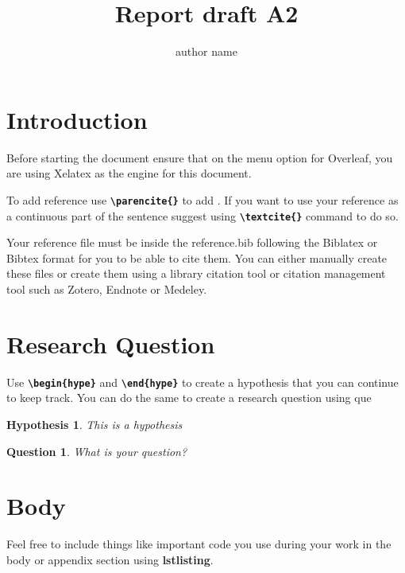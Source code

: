 \documentclass[12pt, a4paper]{article}
\title{Report draft A2}
\author{author name}
\newtheorem{hyp}{Hypothesis} %
\newtheorem{que}{Question} %
\begin{document}





\section{Introduction}

Before starting the document ensure that on the menu option for Overleaf, you are using Xelatex as the engine for this document.

To add reference use \textbf{\texttt{\textbackslash parencite\{\}}} to add \parencite{overleaf2024}. If you want to use your reference as a continuous part of the sentence \textcite{overleaf2024} suggest using \textbf{\texttt{\textbackslash textcite\{\}}} command to do so.

Your reference file must be inside the reference.bib following the Biblatex or Bibtex format for you to be able to cite them. You can either manually create these files or create them using a library citation tool or citation management tool such as Zotero, Endnote or Medeley. 

\section{Research Question}
Use \textbf{\texttt{\textbackslash begin\{hype\}}} and  \textbf{\texttt{\textbackslash end\{hype\}}} to create a hypothesis that you can continue to keep track. You can do the same to create a research question using {que}

\begin{hyp}
    This is a hypothesis
\end{hyp}

\begin{que}
    What is your question?
\end{que}

\section{Body}

Feel free to include things like important code you use during your work in the body or appendix section using \textbf{lstlisting}.
\end{document}
